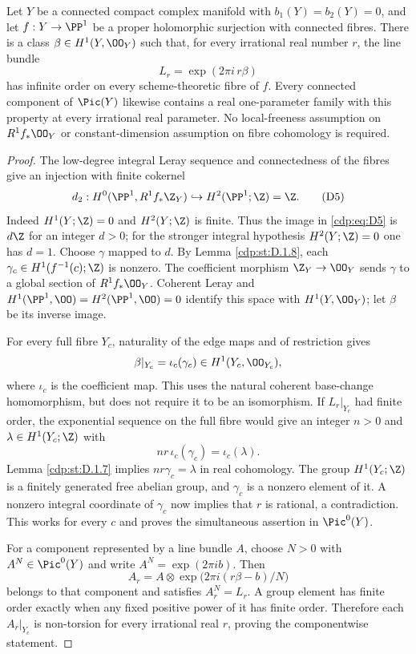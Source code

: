 
\begin{proposition}\label{cdp:st:D.1.9}
Let $Y$ be a connected compact complex manifold with
$b_1(Y)=b_2(Y)=0$, and let $f:Y\to\PP^1$ be a proper
holomorphic surjection with connected fibres. There is a class
$\beta\in H^1(Y,\OO_Y)$ such that, for every irrational real number
$r$, the line bundle
\[
L_r=\exp(2\pi i\,r\beta)
\]
has infinite order on every scheme-theoretic fibre of $f$.
Every connected component of $\Pic(Y)$ likewise contains a real
one-parameter family with this property at every irrational real
parameter.
No local-freeness assumption on $R^1f_*\OO_Y$ or constant-dimension
assumption on fibre cohomology is required.
\end{proposition}
\begin{proof}
The low-degree integral Leray sequence and connectedness of the
fibres give an injection with finite cokernel
\[
d_2:H^0(\PP^1,R^1f_*\Z_Y)
 \hookrightarrow H^2(\PP^1;\Z)=\Z.                   \tag{D5}\label{cdp:eq:D5}
\]
Indeed $H^1(Y;\Z)=0$ and $H^2(Y;\Z)$ is finite.
Thus the image in \eqref{cdp:eq:D5} is $d\Z$ for an integer $d>0$; for the
stronger integral hypothesis $H^2(Y;\Z)=0$ one has $d=1$.
Choose $\gamma$ mapped to $d$. By Lemma \ref{cdp:st:D.1.8},
each $\gamma_c\in H^1(f^{-1}(c);\Z)$ is nonzero.
The coefficient morphism $\Z_Y\to\OO_Y$ sends $\gamma$ to a
global section of $R^1f_*\OO_Y$. Coherent Leray and
$H^1(\PP^1,\OO)=H^2(\PP^1,\OO)=0$ identify this space with
$H^1(Y,\OO_Y)$; let $\beta$ be its inverse image.

For every full fibre $Y_c$, naturality of the edge maps and of
restriction gives
\[
\beta|_{Y_c}=\iota_c(\gamma_c)\in H^1(Y_c,\OO_{Y_c}), 
\]
where $\iota_c$ is the coefficient map. This uses the natural
coherent base-change homomorphism, but does not require it to be
an isomorphism. If $L_r|_{Y_c}$ had finite order, the exponential
sequence on the full fibre would give an integer $n>0$ and
$\lambda\in H^1(Y_c;\Z)$ with
\[
nr\,\iota_c(\gamma_c)=\iota_c(\lambda).
\]
Lemma \ref{cdp:st:D.1.7} implies $nr\gamma_c=\lambda$ in real cohomology.
The group $H^1(Y_c;\Z)$ is a finitely generated free abelian group,
and $\gamma_c$ is a nonzero element of it. A nonzero integral
coordinate of $\gamma_c$ now implies that $r$ is rational, a
contradiction. This works for every $c$ and proves the simultaneous
assertion in $\Pic^0(Y)$.

For a component represented by a line bundle $A$, choose $N>0$
with $A^N\in\Pic^0(Y)$ and write $A^N=\exp(2\pi i b)$.
Then
\[
A_r=A\otimes\exp\bigl(2\pi i(r\beta-b)/N\bigr)
\]
belongs to that component and satisfies $A_r^N=L_r$. A group
element has finite order exactly when any fixed positive power of
it has finite order. Therefore each $A_r|_{Y_c}$ is non-torsion
for every irrational real $r$, proving the componentwise statement.
\end{proof}


